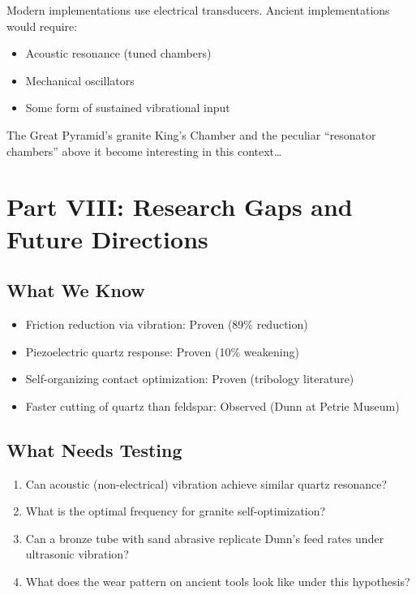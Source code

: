 \documentclass[11pt]{article}
\begin{document}
Modern implementations use electrical transducers. Ancient implementations would require:
\begin{itemize}
    \item Acoustic resonance (tuned chambers)
    \item Mechanical oscillators
    \item Some form of sustained vibrational input
\end{itemize}

The Great Pyramid's granite King's Chamber and the peculiar ``resonator chambers'' above it become interesting in this context\ldots

\section{Part VIII: Research Gaps and Future Directions}

\subsection{What We Know}
\begin{itemize}
    \item Friction reduction via vibration: Proven (89\% reduction)
    \item Piezoelectric quartz response: Proven (10\% weakening)
    \item Self-organizing contact optimization: Proven (tribology literature)
    \item Faster cutting of quartz than feldspar: Observed (Dunn at Petrie Museum)
\end{itemize}

\subsection{What Needs Testing}
\begin{enumerate}
    \item Can acoustic (non-electrical) vibration achieve similar quartz resonance?
    \item What is the optimal frequency for granite self-optimization?
    \item Can a bronze tube with sand abrasive replicate Dunn's feed rates under ultrasonic vibration?
    \item What does the wear pattern on ancient tools look like under this hypothesis?
\end{enumerate}
\end{document}
